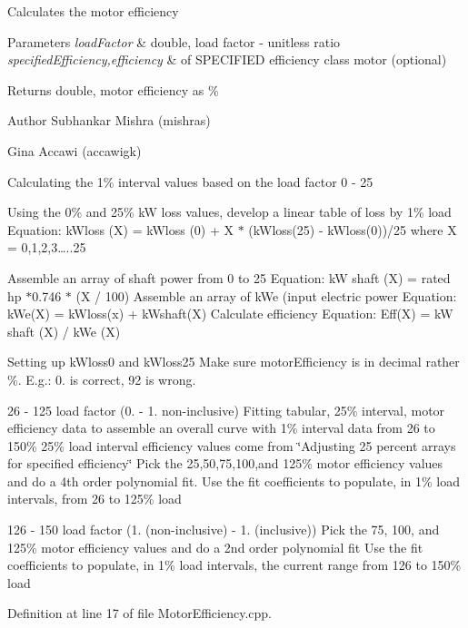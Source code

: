 Calculates the motor efficiency 
\begin{DoxyParams}{Parameters}
{\em load\+Factor} & double, load factor -\/ unitless ratio \\
\hline
{\em specified\+Efficiency,efficiency} & of S\+P\+E\+C\+I\+F\+I\+ED efficiency class motor (optional) \\
\hline
\end{DoxyParams}
\begin{DoxyReturn}{Returns}
double, motor efficiency as \%
\end{DoxyReturn}
\begin{DoxyAuthor}{Author}
Subhankar Mishra (mishras) 

Gina Accawi (accawigk) 
\end{DoxyAuthor}
Calculating the 1\% interval values based on the load factor 0 -\/ 25
\begin{DoxyEnumerate}
\item Using the 0\% and 25\% kW loss values, develop a linear table of loss by 1\% load Equation\+: k\+Wloss (X) = k\+Wloss (0) + X $\ast$ (k\+Wloss(25) -\/ k\+Wloss(0))/25 where X = 0,1,2,3…..25
\item Assemble an array of shaft power from 0 to 25 Equation\+: kW shaft (X) = rated hp $\ast$0.746 $\ast$ (X / 100) Assemble an array of k\+We (input electric power Equation\+: k\+We(\+X) = k\+Wloss(x) + k\+Wshaft(\+X) Calculate efficiency Equation\+: Eff(\+X) = kW shaft (X) / k\+We (X)
\end{DoxyEnumerate}

Setting up k\+Wloss0 and k\+Wloss25 Make sure motor\+Efficiency is in decimal rather \%. E.\+g.\+: 0. is correct, 92 is wrong.

26 -\/ 125 load factor (0. -\/ 1. non-\/inclusive) Fitting tabular, 25\% interval, motor efficiency data to assemble an overall curve with 1\% interval data from 26 to 150\% 25\% load interval efficiency values come from \char`\"{}\+Adjusting 25 percent arrays for specified efficiency\char`\"{} Pick the 25,50,75,100,and 125\% motor efficiency values and do a 4th order polynomial fit. Use the fit coefficients to populate, in 1\% load intervals, from 26 to 125\% load

126 -\/ 150 load factor (1. (non-\/inclusive) -\/ 1. (inclusive)) Pick the 75, 100, and 125\% motor efficiency values and do a 2nd order polynomial fit Use the fit coefficients to populate, in 1\% load intervals, the current range from 126 to 150\% load

Definition at line 17 of file Motor\+Efficiency.\+cpp.

